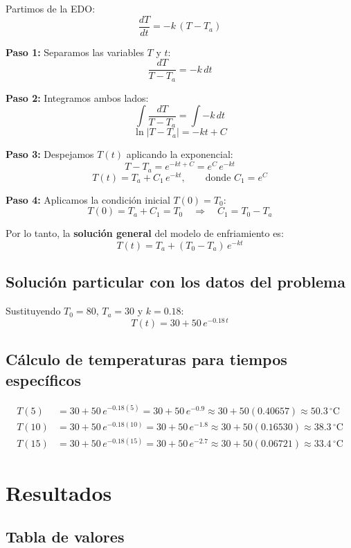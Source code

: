 \documentclass[12pt,a4paper]{article}
\begin{document}
Partimos de la EDO:
\[
\frac{dT}{dt} = -k\,(T - T_a)
\]

\textbf{Paso 1:} Separamos las variables \(T\) y \(t\):
\[
\frac{dT}{T - T_a} = -k\,dt
\]

\textbf{Paso 2:} Integramos ambos lados:
\[
\int \frac{dT}{T - T_a} = \int -k\,dt
\]
\[
\ln|T - T_a| = -k t + C
\]

\textbf{Paso 3:} Despejamos \(T(t)\) aplicando la exponencial:
\[
T - T_a = e^{-k t + C} = e^{C}\,e^{-k t}
\]
\[
T(t) = T_a + C_1\,e^{-k t},\qquad\text{donde } C_1 = e^{C}
\]

\textbf{Paso 4:} Aplicamos la condición inicial \(T(0)=T_0\):
\[
T(0) = T_a + C_1 = T_0 \quad\Longrightarrow\quad C_1 = T_0 - T_a
\]

Por lo tanto, la \textbf{solución general} del modelo de enfriamiento es:
\[
\boxed{T(t) = T_a + (T_0 - T_a)\,e^{-k t}}
\]

\subsection{Solución particular con los datos del problema}

Sustituyendo \(T_0 = 80\), \(T_a = 30\) y \(k = 0.18\):
\[
\boxed{T(t) = 30 + 50\,e^{-0.18\,t}}
\]

\subsection{Cálculo de temperaturas para tiempos específicos}

\begin{align*}
T(5)  &= 30 + 50\,e^{-0.18(5)}  = 30 + 50\,e^{-0.9}  \approx 30 + 50(0.40657) \approx \boxed{50.3\,^{\circ}\mathrm{C}} \\[4pt]
T(10) &= 30 + 50\,e^{-0.18(10)} = 30 + 50\,e^{-1.8}  \approx 30 + 50(0.16530) \approx \boxed{38.3\,^{\circ}\mathrm{C}} \\[4pt]
T(15) &= 30 + 50\,e^{-0.18(15)} = 30 + 50\,e^{-2.7}  \approx 30 + 50(0.06721) \approx \boxed{33.4\,^{\circ}\mathrm{C}}
\end{align*}

\section{Resultados}

\subsection{Tabla de valores}
\end{document}
